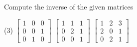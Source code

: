\documentclass{ximera}
\begin{document}
\begin{exercise}
    Compute the inverse of the given matrices
    \begin{tasks}(3)
        \task
        $\begin{bmatrix}
            1 & 0 & 0 \\
            0 & 0 & 1 \\
            0 & 1 & 0
        \end{bmatrix}$
        \task
        $\begin{bmatrix}
            1 & 1 & 1 \\
            0 & 2 & 1 \\
            0 & 0 & 1
        \end{bmatrix}$
        \task
        $\begin{bmatrix}
            1 & 2 & 3 \\
            2 & 0 & 1 \\
            0 & 2 & 1
        \end{bmatrix}$
    \end{tasks}
\end{exercise}
\end{document}
